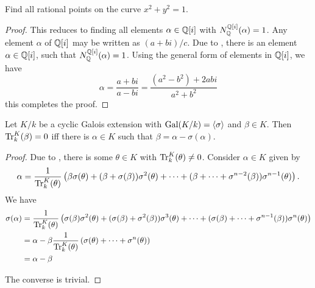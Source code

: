 \begin{example}
    Find all rational points on the curve $x^2 + y^2 = 1$.
\end{example}
\begin{proof}
    This reduces to finding all elements $\alpha\in\mathbb{Q}[i]$ with $N^{\mathbb{Q}[i]}_{\mathbb{Q}}(\alpha) = 1$. Any element $\alpha$ of $\mathbb{Q}[i]$ may be written as $(a + bi)/c$. Due to , there is an element $\alpha\in\mathbb{Q}[i]$, such that $N^{\mathbb{Q}[i]}_{\mathbb{Q}}(\alpha) = 1$. Using the general form of elements in $\mathbb{Q}[i]$, we have 
    \begin{equation*}
        \alpha = \frac{a + bi}{a - bi} = \frac{(a^2 - b^2) + 2abi}{a^2 + b^2}
    \end{equation*}
    this completes the proof.
\end{proof}

\begin{theorem}
    Let $K/k$ be a cyclic Galois extension with $\operatorname{Gal}(K/k) = \langle\sigma\rangle$ and $\beta\in K$. Then $\operatorname{Tr}^K_k(\beta) = 0$ iff there is $\alpha\in K$ such that $\beta = \alpha - \sigma(\alpha)$.
\end{theorem}
\begin{proof}
    Due to , there is some $\theta\in K$ with $\operatorname{Tr}^K_k(\theta)\ne0$. Consider $\alpha\in K$ given by 
    \begin{equation*}
        \alpha = \frac{1}{\operatorname{Tr}^K_k(\theta)}\left(\beta\sigma(\theta) + (\beta + \sigma(\beta))\sigma^2(\theta) + \dots + (\beta + \dots + \sigma^{n - 2}(\beta))\sigma^{n - 1}(\theta)\right).
    \end{equation*}
    We have 
    \begin{align*}
        \sigma(\alpha) &= \frac{1}{\operatorname{Tr}^K_k(\theta)}\left(\sigma(\beta)\sigma^2(\theta) + (\sigma(\beta) + \sigma^2(\beta))\sigma^3(\theta) + \dots + (\sigma(\beta) + \dots + \sigma^{n - 1}(\beta))\sigma^n(\theta)\right)\\
        &= \alpha - \beta\frac{1}{\operatorname{Tr}^K_k(\theta)}\left(\sigma(\theta) + \dots + \sigma^n(\theta)\right)\\
        &= \alpha - \beta
    \end{align*}

    The converse is trivial.
\end{proof}

